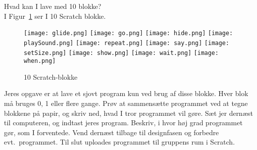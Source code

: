 Hvad kan I lave med 10 blokke?\\
I Figur~\ref{fig:blokke} ser I 10 Scratch blokke.
\begin{figure}
  \centering
  \texttt{[image: glide.png]}
  \texttt{[image: go.png]}
  \texttt{[image: hide.png]}
  \texttt{[image: playSound.png]}
  \texttt{[image: repeat.png]}
  \texttt{[image: say.png]}
  \texttt{[image: setSize.png]}
  \texttt{[image: show.png]}
  \texttt{[image: wait.png]}
  \texttt{[image: when.png]}
  \caption{10 Scratch-blokke}
  \label{fig:blokke}
\end{figure}
Jeres opgave er at lave et sjovt program kun ved brug af disse blokke. Hver blok må bruges 0, 1 eller flere gange. Prøv at sammensætte programmet ved at tegne blokkene på papir, og skriv ned, hvad I tror programmet vil gøre. Sæt jer dernæst til computeren, og indtast jeres program. Beskriv, i hvor høj grad programmet gør, som I forventede. Vend dernæst tilbage til designfasen og forbedre evt.\ programmet. Til slut uploades programmet til gruppens rum i Scratch.
